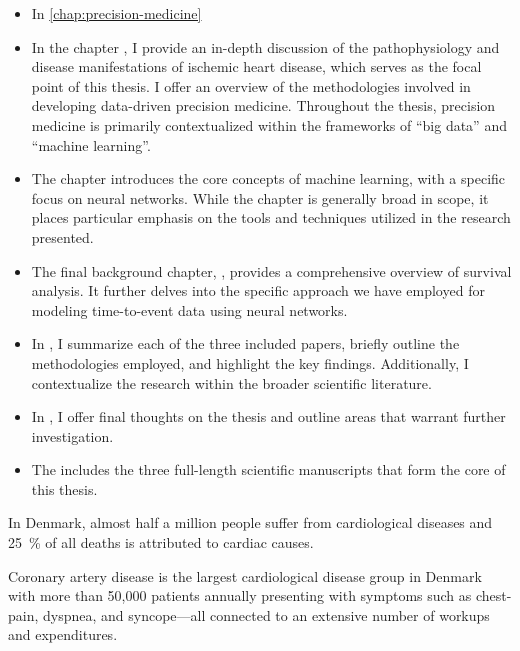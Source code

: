 \begin{itemize} 
    \item In \cref{chap:precision-medicine}


    \item In the chapter , I provide an
        in-depth discussion of the pathophysiology and disease manifestations of
        ischemic heart disease, which serves as the focal point of this thesis.
        I offer an overview of the methodologies involved in developing data-driven
        precision medicine. Throughout the thesis, precision medicine is
        primarily contextualized within the frameworks of \enquote{big data} 
        and \enquote{machine learning}.

    \item The chapter  introduces the core concepts of
        machine learning, with a specific focus on neural networks. While the
        chapter is generally broad in scope, it places particular emphasis on
        the tools and techniques utilized in the research presented.

    \item The final background chapter, , provides a
        comprehensive overview of survival analysis. It further delves into the
        specific approach we have employed for modeling time-to-event data
        using neural networks.  

    \item In , I summarize each of the three included papers,
        briefly outline the methodologies employed, and highlight the key
        findings.  Additionally, I contextualize the research within the
        broader scientific literature.

    \item In , I offer final thoughts on the thesis and
        outline areas that warrant further investigation.

    \item The  includes the three full-length scientific
        manuscripts that form the core of this thesis.

\end{itemize}

In Denmark, almost half a million people suffer 
from cardiological diseases and \qty{25}{\percent} of all deaths 
is attributed to cardiac causes. 

Coronary artery disease
is the largest cardiological disease group in Denmark with
more than 50,000 patients annually
presenting with symptoms such as chest-pain, dyspnea, and
syncope—all connected to an
extensive number of workups and expenditures.

